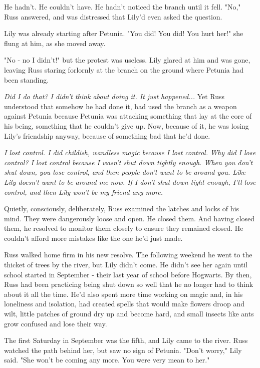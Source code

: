 \documentclass[a4paper,11pt]{article}
\begin{document}
He hadn't. He couldn't have. He hadn't noticed the branch until it fell. "No," Russ answered, and was distressed that Lily'd even asked the question.

Lily was already starting after Petunia. "You did! You did! You hurt her!" she flung at him, as she moved away.

"No - no I didn't!" but the protest was useless. Lily glared at him and was gone, leaving Russ staring forlornly at the branch on the ground where Petunia had been standing.

\emph{Did I do that? I didn't think about doing it. It just happened... }Yet Russ understood that somehow he had done it, had used the branch as a weapon against Petunia because Petunia was attacking something that lay at the core of his being, something that he couldn't give up. Now, because of it, he was losing Lily's friendship anyway, because of something bad that he'd done.

\emph{I lost control. I did childish, wandless magic because I lost control. Why did I lose control? I lost control because I wasn't shut down tightly enough. When you don't shut down, you lose control, and then people don't want to be around you. Like Lily doesn't want to be around me now. If I don't shut down tight enough, I'll lose control, and then Lily won't be my friend any more.}

Quietly, consciously, deliberately, Russ examined the latches and locks of his mind. They were dangerously loose and open. He closed them. And having closed them, he resolved to monitor them closely to ensure they remained closed. He couldn't afford more mistakes like the one he'd just made.

Russ walked home firm in his new resolve. The following weekend he went to the thicket of trees by the river, but Lily didn't come. He didn't see her again until school started in September - their last year of school before Hogwarts. By then, Russ had been practicing being shut down so well that he no longer had to think about it all the time. He'd also spent more time working on magic and, in his loneliness and isolation, had created spells that would make flowers droop and wilt, little patches of ground dry up and become hard, and small insects like ants grow confused and lose their way.

The first Saturday in September was the fifth, and Lily came to the river. Russ watched the path behind her, but saw no sign of Petunia. "Don't worry," Lily said. "She won't be coming any more. You were very mean to her."
\end{document}
